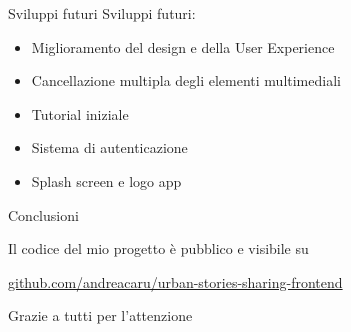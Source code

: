 \documentclass[11pt,aspectratio=169]{beamer}
\begin{document}
\begin{frame}{Sviluppi futuri}
    Sviluppi futuri:
    \begin{itemize}
        \item Miglioramento del design e della User Experience
        \item Cancellazione multipla degli elementi multimediali
        \item Tutorial iniziale
        \item Sistema di autenticazione
        \item Splash screen e logo app
    \end{itemize}
\end{frame}

\begin{frame}{Conclusioni}

  Il codice del mio progetto è pubblico e visibile su

  \begin{center}\url{github.com/andreacaru/urban-stories-sharing-frontend}\end{center}

  \begin{center}\LARGE{Grazie a tutti per l'attenzione}\end{center}

\end{frame}
\end{document}
